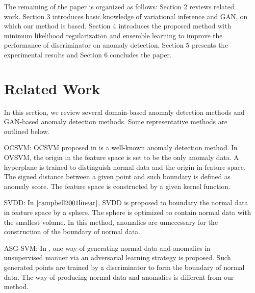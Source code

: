 \documentclass[a4paper,conference]{IEEEtran}
\begin{document}
The remaining  of the paper is organized as follows: Section 2 reviews related work. Section 3 introduces basic knowledge of variational inference and GAN, on which our method is based. Section 4 introduces the proposed method with minimum likelihood  regularization and ensemble learning to improve the performance of discriminator on anomaly detection. Section 5 presents the experimental results and  Section 6 concludes the paper.

\section{Related Work}
In this section, we review several domain-based anomaly detection methods and  GAN-based anomaly detection methods. Some representative methods are outlined below.


OCSVM: OCSVM  proposed in \cite{scholkopf2001} is a well-known anomaly detection method. In OVSVM, the origin in the feature space is set to be the only anomaly data. A hyperplane is trained to distinguish normal data and the origin in feature space. The signed distance between a given point and such boundary is defined as anomaly score. The feature space is constructed by a given kernel function.

SVDD: In $\cite{campbell2001linear}$, SVDD is proposed to boundary the normal data in feature space by a sphere. The sphere is optimized to contain normal data with the smallest volume. In this method, anomalies are  unnecessary for the construction of the  boundary of normal data.


ASG-SVM: In \cite{yu2017open}, one way of generating normal data and  anomalies in unsupervised manner via an adversarial learning strategy is proposed. Such generated points are trained by a discriminator to form the boundary of normal data.  The way of producing normal data and anomalies is different from our method.
\end{document}
